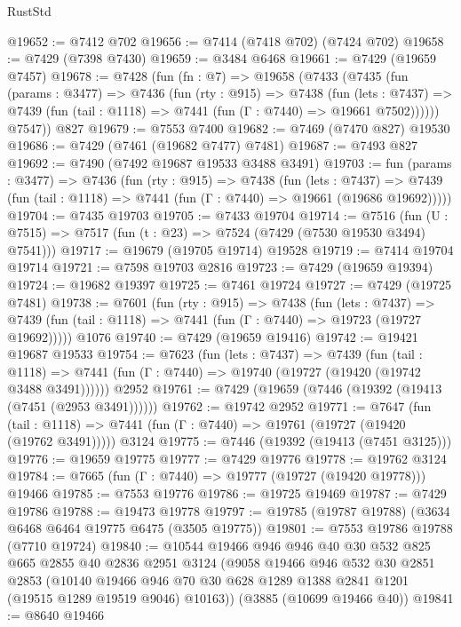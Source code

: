 \begin{lexlean}{RustStd}
\begin{coremodule}
@19652 := @7412 @702
@19656 := @7414 (@7418 @702) (@7424 @702)
@19658 := @7429 (@7398 @7430)
@19659 := @3484 @6468
@19661 := @7429 (@19659 @7457)
@19678 := @7428
    (fun (fn : @7) =>
    @19658
      (@7433
        (@7435
          (fun (params : @3477) =>
          @7436
            (fun (rty : @915) =>
            @7438
              (fun (lets : @7437) =>
              @7439 (fun (tail : @1118) => @7441 (fun (Γ : @7440) => @19661 @7502))))))
        @7547))
    @827
@19679 := @7553 @7400
@19682 := @7469 (@7470 @827) @19530
@19686 := @7429 (@7461 (@19682 @7477) @7481)
@19687 := @7493 @827
@19692 := @7490 (@7492 @19687 @19533 @3488 @3491)
@19703 := fun (params : @3477) =>
  @7436
    (fun (rty : @915) =>
    @7438
      (fun (lets : @7437) =>
      @7439 (fun (tail : @1118) => @7441 (fun (Γ : @7440) => @19661 (@19686 @19692)))))
@19704 := @7435 @19703
@19705 := @7433 @19704
@19714 := @7516
    (fun (U : @7515) => @7517 (fun (t : @23) => @7524 (@7429 (@7530 @19530 @3494) @7541)))
@19717 := @19679 (@19705 @19714) @19528
@19719 := @7414 @19704 @19714
@19721 := @7598 @19703 @2816
@19723 := @7429 (@19659 @19394)
@19724 := @19682 @19397
@19725 := @7461 @19724
@19727 := @7429 (@19725 @7481)
@19738 := @7601
    (fun (rty : @915) =>
    @7438
      (fun (lets : @7437) =>
      @7439 (fun (tail : @1118) => @7441 (fun (Γ : @7440) => @19723 (@19727 @19692)))))
    @1076
@19740 := @7429 (@19659 @19416)
@19742 := @19421 @19687 @19533
@19754 := @7623
    (fun (lets : @7437) =>
    @7439
      (fun (tail : @1118) =>
      @7441 (fun (Γ : @7440) => @19740 (@19727 (@19420 (@19742 @3488 @3491))))))
    @2952
@19761 := @7429 (@19659 (@7446 (@19392 (@19413 (@7451 (@2953 @3491))))))
@19762 := @19742 @2952
@19771 := @7647
    (fun (tail : @1118) => @7441 (fun (Γ : @7440) => @19761 (@19727 (@19420 (@19762 @3491)))))
    @3124
@19775 := @7446 (@19392 (@19413 (@7451 @3125)))
@19776 := @19659 @19775
@19777 := @7429 @19776
@19778 := @19762 @3124
@19784 := @7665 (fun (Γ : @7440) => @19777 (@19727 (@19420 @19778))) @19466
@19785 := @7553 @19776
@19786 := @19725 @19469
@19787 := @7429 @19786
@19788 := @19473 @19778
@19797 := @19785 (@19787 @19788) (@3634 @6468 @6464 @19775 @6475 (@3505 @19775))
@19801 := @7553 @19786 @19788 (@7710 @19724)
@19840 := @10544
    @19466
    @946
    @946
    @40
    @30
    @532
    @825
    @665
    @2855
    @40
    @2836
    @2951
    @3124
    (@9058
      @19466
      @946
      @532
      @30
      @2851
      @2853
      (@10140 @19466 @946 @70 @30 @628 @1289 @1388 @2841 @1201 (@19515 @1289 @19519 @9046) @10163))
    (@3885 (@10699 @19466 @40))
@19841 := @8640 @19466

\end{coremodule}
\end{lexlean}
